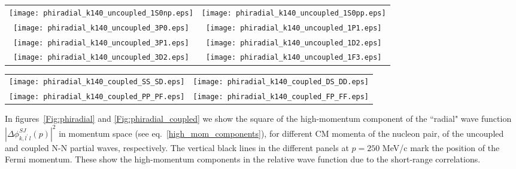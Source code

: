 \documentclass[aps,twocolumn,showpacs,preprintnumbers,amsmath,amssymb,nofootinbib,superscriptaddress,showkeys,noeprint]{revtex4-1}
\begin{document}
\begin{figure*}[!ht]
\begin{tabular}{cc}
\texttt{[image: phiradial\_k140\_uncoupled\_1S0np.eps]}&
\texttt{[image: phiradial\_k140\_uncoupled\_1S0pp.eps]}\\
\texttt{[image: phiradial\_k140\_uncoupled\_3P0.eps]}&
\texttt{[image: phiradial\_k140\_uncoupled\_1P1.eps]}\\
\texttt{[image: phiradial\_k140\_uncoupled\_3P1.eps]}&
\texttt{[image: phiradial\_k140\_uncoupled\_1D2.eps]}\\
\texttt{[image: phiradial\_k140\_uncoupled\_3D2.eps]}&
\texttt{[image: phiradial\_k140\_uncoupled\_1F3.eps]}
\end{tabular}
\caption{``Radial" wave functions $\left|\Delta\phi^{SJ}_{k,
    l^\prime\,l}(p) \right|^2$ for the uncoupled N-N partial waves,
  i.e, for $l=l^\prime$.  The results are given for relative momentum
  $k=140$ MeV/c, and for different values of the CM momentum as
  labeled in the key of the first panel.  The results for $K_{\rm
    CM}=0$ MeV/c (solid purple lines) are the same as those shown in
  the upper panel of Fig. 6 of Ref.~\cite{RuizSimo:2017tcb}.}
\label{Fig:phiradial}
\end{figure*}

\begin{figure*}[!ht]
\begin{tabular}{cc}
\texttt{[image: phiradial\_k140\_coupled\_SS\_SD.eps]}&
\texttt{[image: phiradial\_k140\_coupled\_DS\_DD.eps]}\\
\texttt{[image: phiradial\_k140\_coupled\_PP\_PF.eps]}&
\texttt{[image: phiradial\_k140\_coupled\_FP\_FF.eps]}
\end{tabular}
\caption{``Radial" wave functions $\left| \Delta\phi^{SJ}_{k,
    l^\prime\,l}(p) \right|^2$ for the coupled N-N partial waves. The
  results are given for relative momentum $k=140$ MeV/c, and for
  different values of the CM momentum as labeled in different colors
  in the key of the first panel. The solid lines correspond to the
  diagonal $l^\prime=l$ waves, while the dashed lines are the results
  corresponding to the off-diagonal ($l^\prime\ne l$) coupled waves.}
\label{Fig:phiradial_coupled}
\end{figure*}

In figures~\ref{Fig:phiradial} and \ref{Fig:phiradial_coupled} we show
the square of the high-momentum component of the ``radial" wave
function $\left| \Delta\phi^{SJ}_{k, l^\prime\,l}(p) \right|^2$ in
momentum space (see eq.~\ref{high_mom_components}), for different CM
momenta of the nucleon pair, of the uncoupled and coupled N-N partial
waves, respectively. The vertical black lines in the different panels
at $p=250$ MeV/c mark the position of the Fermi momentum. These show
the high-momentum components in the relative wave function due to the
short-range correlations.
\end{document}
